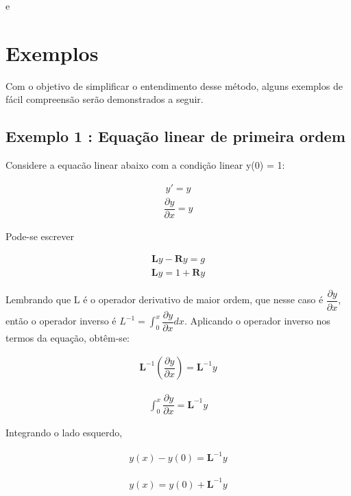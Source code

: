   e
 
 
 \section{Exemplos}
 
 Com o objetivo de simplificar o entendimento desse método, alguns exemplos de fácil compreensão serão demonstrados a seguir.
 
 \subsection{Exemplo 1 : Equação linear de primeira ordem}
 
 Considere a equacão linear abaixo com a condição linear y(0) = 1:
 
 \begin{gather*}
 y' = y 
  \end{gather*}
   \begin{gather*}
 \dfrac{\partial y}{\partial x} = y
 \end{gather*}

Pode-se escrever

\begin{gather*}
 \textbf{L}y - \textbf{R}y = g
  \end{gather*}
  \begin{gather*}
 \textbf{L}y = 1 + \textbf{R}y 
  \end{gather*}
  
  Lembrando que L é o operador derivativo de maior ordem, que nesse caso é $\dfrac{\partial y}{\partial x}$, então o operador inverso é $L^{-1}=\int_0^{x}\dfrac{\partial y}{\partial x} dx$. Aplicando o operador inverso nos termos da equação, obtêm-se:

\begin{gather*}
 \textbf{L}^{-1}\left(\dfrac{\partial y}{\partial x}\right) = \textbf{L}^{-1} y
  \end{gather*}
  
  \begin{gather*}
  \int_0^{x}\dfrac{\partial y}{\partial x} = \textbf{L}^{-1} y
\end{gather*} 

Integrando o lado esquerdo,

 \begin{gather*}
  y(x) - y(0) = \textbf{L}^{-1} y
\end{gather*} 

 \begin{gather*}
  y(x) = y(0) + \textbf{L}^{-1} y
\end{gather*} 
 
